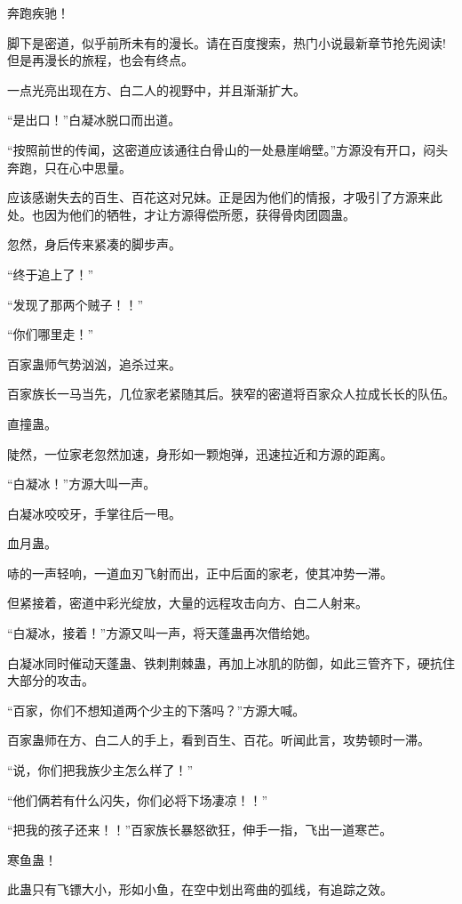 
\begin{this_body}

奔跑疾驰！

脚下是密道，似乎前所未有的漫长。请在百度搜索，热门小说最新章节抢先阅读!但是再漫长的旅程，也会有终点。

一点光亮出现在方、白二人的视野中，并且渐渐扩大。

“是出口！”白凝冰脱口而出道。

“按照前世的传闻，这密道应该通往白骨山的一处悬崖峭壁。”方源没有开口，闷头奔跑，只在心中思量。

应该感谢失去的百生、百花这对兄妹。正是因为他们的情报，才吸引了方源来此处。也因为他们的牺牲，才让方源得偿所愿，获得骨肉团圆蛊。

忽然，身后传来紧凑的脚步声。

“终于追上了！”

“发现了那两个贼子！！”

“你们哪里走！”

百家蛊师气势汹汹，追杀过来。

百家族长一马当先，几位家老紧随其后。狭窄的密道将百家众人拉成长长的队伍。

直撞蛊。

陡然，一位家老忽然加速，身形如一颗炮弹，迅速拉近和方源的距离。

“白凝冰！”方源大叫一声。

白凝冰咬咬牙，手掌往后一甩。

血月蛊。

哧的一声轻响，一道血刃飞射而出，正中后面的家老，使其冲势一滞。

但紧接着，密道中彩光绽放，大量的远程攻击向方、白二人射来。

“白凝冰，接着！”方源又叫一声，将天蓬蛊再次借给她。

白凝冰同时催动天蓬蛊、铁刺荆棘蛊，再加上冰肌的防御，如此三管齐下，硬抗住大部分的攻击。

“百家，你们不想知道两个少主的下落吗？”方源大喊。

百家蛊师在方、白二人的手上，看到百生、百花。听闻此言，攻势顿时一滞。

“说，你们把我族少主怎么样了！”

“他们俩若有什么闪失，你们必将下场凄凉！！”

“把我的孩子还来！！”百家族长暴怒欲狂，伸手一指，飞出一道寒芒。

寒鱼蛊！

此蛊只有飞镖大小，形如小鱼，在空中划出弯曲的弧线，有追踪之效。


\end{this_body}
